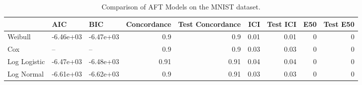 \begin{table*}
\centering
\caption{Comparison of AFT Models on the MNIST dataset.}
\label{tab:mnist}
\begin{tabular}{lllrrrrrr}
\toprule
 & AIC & BIC & Concordance & Test Concordance & ICI & Test ICI & E50 & Test E50 \\
\midrule
Weibull & -6.46e+03 & -6.47e+03 & 0.9 & 0.9 & 0.01 & 0.01 & 0 & 0 \\
Cox & -- & -- & 0.9 & 0.9 & 0.03 & 0.03 & 0 & 0 \\
Log Logistic & -6.47e+03 & -6.48e+03 & 0.91 & 0.91 & 0.04 & 0.04 & 0 & 0 \\
Log Normal & -6.61e+03 & -6.62e+03 & 0.9 & 0.91 & 0.03 & 0.03 & 0 & 0 \\
\bottomrule
\end{tabular}
\end{table*}
